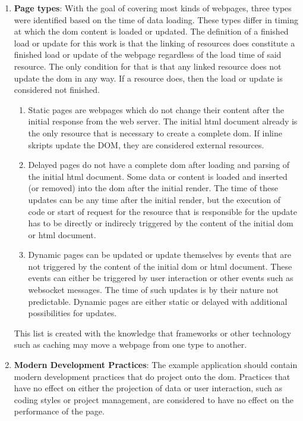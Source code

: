 \documentclass[a4paper, 10pt]{article}
\begin{document}
\begin{enumerate}
  \item \textbf{Page types}: With the goal of covering most kinds of webpages, three types were identified based on the time of data loading.\label{enum:pagetypes}
  These types differ in timing at which the \acrshort{dom} content is loaded or updated.
  The definition of a finished load or update for this work is that the linking of resources does constitute a finished load or update of the webpage regardless of the load time of said resource.
  The only condition for that is that any linked resource does not update the \acrshort{dom} in any way.
  If a resource does, then the load or update is considered not finished.
  \begin{enumerate}
    \item Static pages are webpages which do not change their content after the initial response from the web server.
    The initial \acrshort{html} document already is the only resource that is necessary to create a complete \acrshort{dom}.
    If inline skripts update the DOM, they are considered external resources.
    \item Delayed pages do not have a complete \acrshort{dom} after loading and parsing of the initial \acrshort{html} document.
    Some data or content is loaded and inserted (or removed) into the \acrshort{dom} after the initial render.
    The time of these updates can be any time after the initial render, but the execution of code or start of request for the resource that is responsible for the update has to be directly or indirecly triggered by the content of the initial \acrshort{dom} or \acrshort{html} document.
    \item Dynamic pages can be updated or update themselves by events that are not triggered by the content of the initial \acrshort{dom} or \acrshort{html} document.
    These events can either be triggered by user interaction or other events such as websocket messages.
    The time of such updates is by their nature not predictable.
    Dynamic pages are either static or delayed with additional possibilities for updates.
  \end{enumerate}
  This list is created with the knowledge that frameworks or other technology such as caching may move a webpage from one type to another.

  \item \textbf{Modern Development Practices}: The example application should contain modern development practices that do project onto the \acrshort{dom}.
  Practices that have no effect on either the projection of data or user interaction, such as coding styles or project management, are considered to have no effect on the performance of the page.
  

\end{enumerate}
\end{document}
